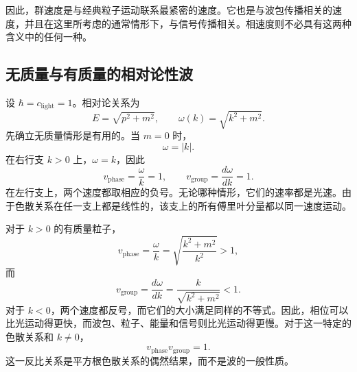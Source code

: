 \begin{classroomqa}
\end{classroomqa}

因此，群速度是与经典粒子运动联系最紧密的速度。它也是与波包传播相关的速度，并且在这里所考虑的通常情形下，与信号传播相关。相速度则不必具有这两种含义中的任何一种。

\subsection{无质量与有质量的相对论性波}

\begin{classroomqa}
\end{classroomqa}

\begin{classroomqa}
\end{classroomqa}

设 \(\hbar=c_{\mathrm{light}}=1\)。相对论关系为
\begin{equation}
E=\sqrt{p^2+m^2},
\qquad
\omega(k)=\sqrt{k^2+m^2}.
\end{equation}
先确立无质量情形是有用的。当 \(m=0\) 时，
\begin{equation}
\omega=|k|.
\end{equation}
在右行支 \(k>0\) 上，\(\omega=k\)，因此
\begin{equation}
v_{\mathrm{phase}}=\frac{\omega}{k}=1,
\qquad
v_{\mathrm{group}}=\frac{d\omega}{dk}=1.
\end{equation}
在左行支上，两个速度都取相应的负号。无论哪种情形，它们的速率都是光速。由于色散关系在任一支上都是线性的，该支上的所有傅里叶分量都以同一速度运动。

对于 \(k>0\) 的有质量粒子，
\begin{equation}
v_{\mathrm{phase}}
=\frac{\omega}{k}
=\sqrt{\frac{k^2+m^2}{k^2}}>1,
\end{equation}
而
\begin{equation}
v_{\mathrm{group}}
=\frac{d\omega}{dk}
=\frac{k}{\sqrt{k^2+m^2}}<1.
\end{equation}
对于 \(k<0\)，两个速度都反号，而它们的大小满足同样的不等式。因此，相位可以比光运动得更快，而波包、粒子、能量和信号则比光运动得更慢。对于这一特定的色散关系和 \(k\neq0\)，
\begin{equation}
v_{\mathrm{phase}}v_{\mathrm{group}}=1.
\end{equation}
这一反比关系是平方根色散关系的偶然结果，而不是波的一般性质。

